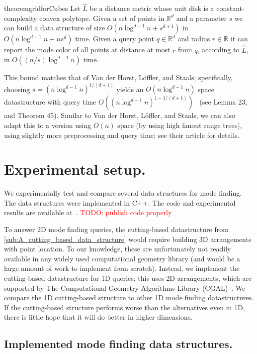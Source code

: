 \documentclass[twoside,leqno,twocolumn]{article}
\newcommand{\R} {\mathbb{R}\xspace}
\newcommand{\cpp}{C++\xspace}
\newcommand{\todo}[1]{\textcolor{red}{TODO: #1}}
\begin{document}
\begin{restatable}{theorem}{gridforCubes}
  \label{thm:grid_for_cubes}
Let $\hat{L}$ be a distance metric whose unit disk is a constant-complexity convex polytope. Given a set of points in $\R^d$ and a parameter $s$ we can build a data structure of size $O(n \log^{d-1} n + s^{d+1})$ in
  $O(n \log^{d-1} n + ns^d)$ time. Given a query point $q \in \R^d$ and radius $r \in \R$ it can report the mode color of all points at distance at most $r$ from $q$, according to $\hat{L}$, in $O((n/s)\log^{d-1} n)$ time.
\end{restatable}

This bound matches that of Van der Horst, Löffler, and
Staals; specifically, choosing $s = (n\log^{d-1}n)^{1/(d+1)}$ yields an $O(n \log^{d-1} n)$ space datastructure with query time $O((n \log^{d-1} n)^{1 - 1/(d+1)})$~\cite{chromatic_knn2025} (see Lemma 23, and Theorem 45). Similar to Van der Horst, Löffler, and Staals, we can also adapt this to a version using $O(n)$ space (by using high fanout range trees), using slightly more preprocessing and query time; see their article for details.


\section{Experimental setup.}
\label{sec:experimental_setup}
We experimentally test and compare several data structures for mode
finding. The data
structures were implemented in \cpp. The code and experimental results are available at~\cite{code}. \todo{publish code properly}

To answer 2D mode finding queries, the cutting-based datastructure from
\cref{sub:A_cutting_based_data_structure} would require building 3D
arrangements with point location. To our knowledge, these are unfortunately not readily
available in any widely used computational geometry library
(and would be a large amount of work to implement from scratch). Instead, we
implement the cutting-based datastructure for 1D queries; this uses 2D
arrangements, which are supported by The Computational Geometry
Algorithms Library (CGAL)~\cite{cgal:library,cgal:arrangements}.
We compare the 1D cutting-based structure to other 1D mode finding datastructures. If the cutting-based structure performs worse than the alternatives even in 1D, there is little hope that it will do better in higher dimensions.


\subsection{Implemented mode finding data structures.}
\label{sub:implementedDatastructs}
\end{document}
